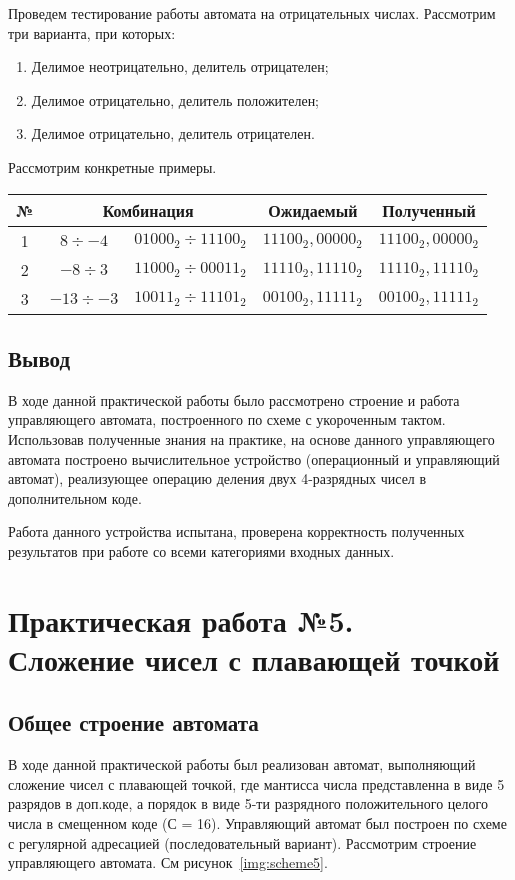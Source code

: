 \documentclass[a4paper,14pt]{extarticle}
\begin{document}
Проведем тестирование работы автомата на отрицательных числах. Рассмотрим три варианта, при которых:
\begin{enumerate}
	\item Делимое неотрицательно, делитель отрицателен;
	\item Делимое отрицательно, делитель положителен;
	\item Делимое отрицательно, делитель отрицателен.
\end{enumerate}
Рассмотрим конкретные примеры.
\vspace{2ex}\\
\begin{tabularx}{\linewidth}{|c|c|X|X|X|}%
	\hline
	\textbf{№} &\multicolumn{2}{c|}{\textbf{Комбинация}} & \multicolumn{1}{c|}{\small\textbf{Ожидаемый}} & \multicolumn{1}{c|}{\small\textbf{Полученный}}\\
	\hline
	1 &$8\div-4$& $01000_2\div 11100_2 $ & $11100_2,00000_2$ & $11100_2,00000_2$ \\ 
	\hline
	2&$-8\div3$& $11000_2\div00011_2$ &$11110_2,11110_2$ & $11110_2,11110_2$ \\
	\hline
	3&$-13\div-3$& $10011_2\div11101_2$ & $00100_2,11111_2$ & $00100_2,11111_2$ \\
	\hline
\end{tabularx}

\subsection {Вывод}
В ходе данной практической работы было рассмотрено строение и работа управляющего автомата, построенного по схеме с укороченным тактом. Использовав полученные знания на практике, на основе данного управляющего автомата построено вычислительное устройство (операционный и управляющий автомат), реализующее операцию деления двух 4-разрядных чисел в дополнительном коде.

Работа данного устройства испытана, проверена корректность полученных результатов при работе со всеми категориями входных данных. 
\newpage
\section {Практическая работа №5.\\Сложение чисел с плавающей точкой }
\subsection{Общее строение автомата}
В ходе данной практической работы был реализован автомат, выполняющий сложение чисел с плавающей точкой, где мантисса числа представленна в виде 5 разрядов в доп.коде, а порядок в виде 5-ти разрядного положительного целого числа в смещенном коде (С = 16). Управляющий автомат был построен по схеме с регулярной адресацией (последовательный вариант). Рассмотрим строение управляющего автомата. См рисунок~\ref{img:scheme5}.
\end{document}
